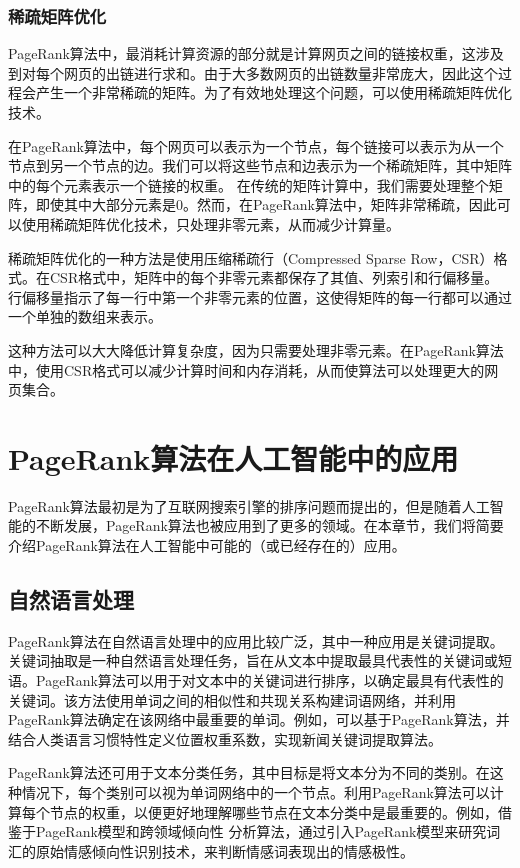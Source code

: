 \documentclass[UTF8,openany]{ctexbook}
\begin{document}
\subsection[稀疏矩阵优化]{稀疏矩阵优化}

PageRank算法中，最消耗计算资源的部分就是计算网页之间的链接权重，这涉及到对每个网页的出链进行求和。由于大多数网页的出链数量非常庞大，因此这个过程会产生一个非常稀疏的矩阵。为了有效地处理这个问题，可以使用稀疏矩阵优化技术。

在PageRank算法中，每个网页可以表示为一个节点，每个链接可以表示为从一个节点到另一个节点的边。我们可以将这些节点和边表示为一个稀疏矩阵，其中矩阵中的每个元素表示一个链接的权重。
在传统的矩阵计算中，我们需要处理整个矩阵，即使其中大部分元素是0。然而，在PageRank算法中，矩阵非常稀疏，因此可以使用稀疏矩阵优化技术，只处理非零元素，从而减少计算量。

稀疏矩阵优化的一种方法是使用压缩稀疏行（Compressed Sparse Row，CSR）格式。在CSR格式中，矩阵中的每个非零元素都保存了其值、列索引和行偏移量。行偏移量指示了每一行中第一个非零元素的位置，这使得矩阵的每一行都可以通过一个单独的数组来表示。

这种方法可以大大降低计算复杂度，因为只需要处理非零元素。在PageRank算法中，使用CSR格式可以减少计算时间和内存消耗，从而使算法可以处理更大的网页集合\cite{bi:ACM}。

\chapter[PageRank算法在人工智能中的应用]{PageRank算法在人工智能中的应用}
\thispagestyle{fancy}

PageRank算法最初是为了互联网搜索引擎的排序问题而提出的，但是随着人工智能的不断发展，PageRank算法也被应用到了更多的领域。在本章节，我们将简要介绍PageRank算法在人工智能中可能的（或已经存在的）应用。

\section[自然语言处理]{自然语言处理}

PageRank算法在自然语言处理中的应用比较广泛，其中一种应用是关键词提取。
关键词抽取是一种自然语言处理任务，旨在从文本中提取最具代表性的关键词或短语。PageRank算法可以用于对文本中的关键词进行排序，以确定最具有代表性的关键词。该方法使用单词之间的相似性和共现关系构建词语网络，并利用PageRank算法确定在该网络中最重要的单词。例如，可以基于PageRank算法，并结合人类语言习惯特性定义位置权重系数，实现新闻关键词提取算法\cite{bi:XW}。

PageRank算法还可用于文本分类任务，其中目标是将文本分为不同的类别。在这种情况下，每个类别可以视为单词网络中的一个节点。利用PageRank算法可以计算每个节点的权重，以便更好地理解哪些节点在文本分类中是最重要的。例如，借鉴于PageRank模型和跨领域倾向性
分析算法，通过引入PageRank模型来研究词汇的原始情感倾向性识别技术，来判断情感词表现出的情感极性\cite{bi:QG}。
\end{document}
